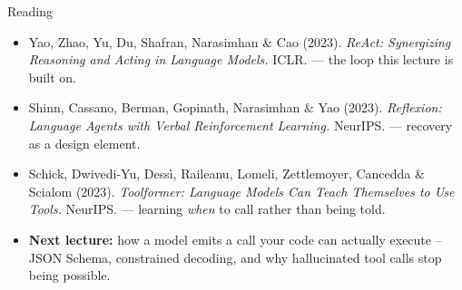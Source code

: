 \begin{frame}{Reading}
\begin{itemize}
  \item Yao, Zhao, Yu, Du, Shafran, Narasimhan \& Cao (2023). \textit{ReAct: Synergizing Reasoning and Acting in Language Models.} ICLR. --- the loop this lecture is built on.
  \pause
  \item Shinn, Cassano, Berman, Gopinath, Narasimhan \& Yao (2023). \textit{Reflexion: Language Agents with Verbal Reinforcement Learning.} NeurIPS. --- recovery as a design element.
  \pause
  \item Schick, Dwivedi-Yu, Dess\`i, Raileanu, Lomeli, Zettlemoyer, Cancedda \& Scialom (2023). \textit{Toolformer: Language Models Can Teach Themselves to Use Tools.} NeurIPS. --- learning \emph{when} to call rather than being told.
  \pause
  \item \textbf{Next lecture:} how a model emits a call your code can actually execute -- JSON Schema, constrained decoding, and why hallucinated tool calls stop being possible.
\end{itemize}
\end{frame}
